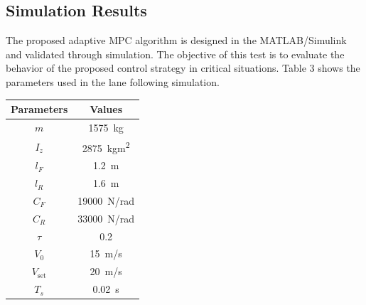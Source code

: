\subsection{Simulation Results}
The proposed adaptive MPC algorithm is designed in the MATLAB/Simulink and validated through simulation. The objective of this test is to evaluate the behavior of the proposed control strategy in critical situations.
Table 3 shows the parameters used in the lane following simulation.
\begin{table}[!h]
	\centering
	\begin{tabular}{|c|c|}
		\hline
		Parameters          & Values      \\
		\hline
		$m$          & \SI{1575}{kg}              \\
		$I_z$         & \SI{2875}{kgm^2}               \\
		$l_F$           & \SI{1.2}{m}               \\
		$l_R$         & \SI{1.6}{m}               \\
		$C_F$          & \SI{19000}{\newton/rad}      \\
		$C_R$           & \SI{33000}{\newton/rad}  \\
		$\tau$             & 0.2                \\
		$V_0$           & \SI{15}{m/s}       \\
		$V_{\text{set}}$          & \SI{20}{m/s}   \\
		$T_s$         & \SI{0.02}{s}          \\
		\hline
	\end{tabular}
\end{table}

